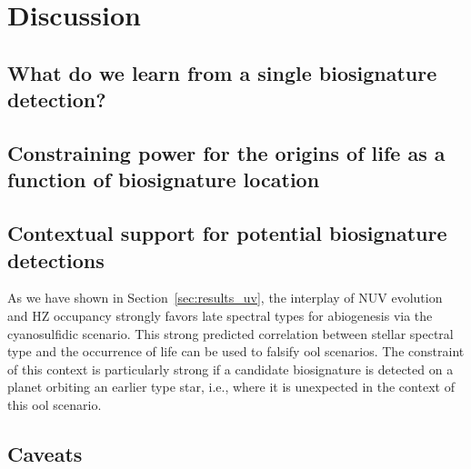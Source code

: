 \documentclass[modern,linenumbers]{aastex631}
\begin{document}
\section{Discussion}
\label{sec:discussion}

\subsection{What do we learn from a single biosignature detection?}

\subsection{Constraining power for the origins of life as a function of biosignature location}

\subsection{Contextual support for potential biosignature detections}
As we have shown in Section~\ref{sec:results_uv}, the interplay of \gls{NUV} evolution and \gls{HZ} occupancy strongly favors late spectral types for abiogenesis via the cyanosulfidic scenario.
This strong predicted correlation between stellar spectral type and the occurrence of life can be used to falsify \gls{ool} scenarios.
The constraint of this context is particularly strong if a candidate biosignature is detected on a planet orbiting an earlier type star, i.e., where it is unexpected in the context of this \gls{ool} scenario.



\subsection{Caveats}
\end{document}
